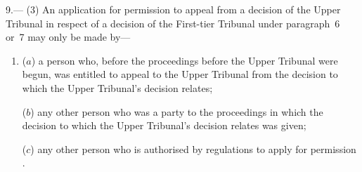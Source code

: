 \documentclass[12pt,a4paper]{article}
\begin{document}
9.---%
%
%
%
(3) 
An application for permission to appeal from a decision of the Upper Tribunal in respect of a decision of the First-tier Tribunal under paragraph~6 or~7  %
may only be made by—
\begin{enumerate}\item[]
($a$) a person who, before the proceedings before the 
Upper Tribunal  %
were begun, was entitled to appeal to the 
Upper Tribunal  %
from the decision to which the 
Upper Tribunal's  %
decision relates;

($b$) any other person who was a party to the proceedings in which the decision to which the 
Upper Tribunal's  %
decision relates was given;

($c$) any other person who is authorised by regulations to apply for 
permission%
.
\end{enumerate}
\end{document}
